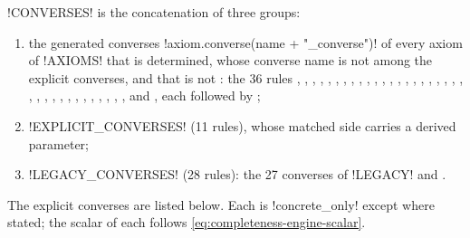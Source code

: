 \py!CONVERSES! is the concatenation of three groups:
\begin{enumerate}
\item the generated converses \py!axiom.converse(name + "_converse")! of every axiom of \py!AXIOMS!
  that is determined, whose converse name is not among the explicit converses, and that is not
  : the 36 rules , , ,
  , , , , ,
  , , , , ,
  , , , , ,
  , , , , ,
  , , , , ,
  , , , , ,
  , , and
  , each followed by ;
\item \py!EXPLICIT_CONVERSES! (11 rules), whose matched side carries a derived parameter;
\item \py!LEGACY_CONVERSES! (28 rules): the 27 converses of \py!LEGACY! and
  .
\end{enumerate}
The explicit converses are listed below. Each is \py!concrete_only! except where stated; the
scalar of each follows \cref{eq:completeness-engine-scalar}.

